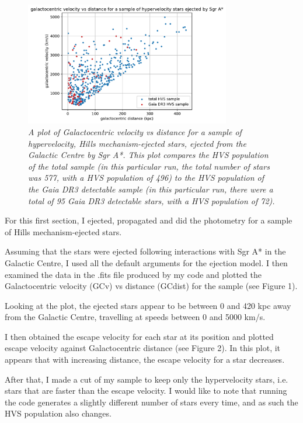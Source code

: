 \documentclass{article}
\begin{document}
\begin{figure}[h!]
\caption{\textit{A plot of Galactocentric velocity vs distance for a sample of hypervelocity, Hills mechanism-ejected stars, ejected from the Galactic Centre by Sgr A*. This plot compares the HVS population of the total sample (in this particular run, the total number of stars was 577, with a HVS population of 496) to the HVS population of the Gaia DR3 detectable sample (in this particular run, there were a total of 95 Gaia DR3 detectable stars, with a HVS population of 72).}}
\centering
\includegraphics[width=0.8\textwidth]{GCv_vs_GCdist_hyp_1b.pdf}
\end{figure}

For this first section, I ejected, propagated and did the photometry for a sample of Hills mechanism-ejected stars. 

Assuming that the stars were ejected following interactions with Sgr A* in the Galactic Centre, I used all the default arguments for the ejection model. I then examined the data in the .fits file produced by my code and plotted the Galactocentric velocity (GCv) vs distance (GCdist) for the sample (see Figure 1). 

Looking at the plot, the ejected stars appear to be between 0 and 420 kpc away from the Galactic Centre, travelling at speeds between 0 and 5000 km/s.

I then obtained the escape velocity for each star at its position and plotted escape velocity against Galactocentric distance (see Figure 2). In this plot, it appears that with increasing distance, the escape velocity for a star decreases.

After that, I made a cut of my sample to keep only the hypervelocity stars, i.e. stars that are faster than the escape velocity. I would like to note that running the code generates a slightly different number of stars every time, and as such the HVS population also changes. 
\end{document}
